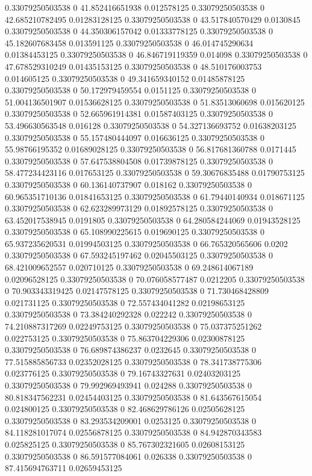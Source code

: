 0.33079250503538 0 41.852416651938 0.012578125
0.33079250503538 0 42.685210782495 0.01283128125
0.33079250503538 0 43.517840570429 0.0130845
0.33079250503538 0 44.350306157042 0.01333778125
0.33079250503538 0 45.182607683458 0.013591125
0.33079250503538 0 46.014745290634 0.01384453125
0.33079250503538 0 46.846719119359 0.014098
0.33079250503538 0 47.678529310249 0.01435153125
0.33079250503538 0 48.510176003753 0.014605125
0.33079250503538 0 49.341659340152 0.01485878125
0.33079250503538 0 50.172979459554 0.0151125
0.33079250503538 0 51.004136501907 0.01536628125
0.33079250503538 0 51.83513060698 0.015620125
0.33079250503538 0 52.665961914381 0.01587403125
0.33079250503538 0 53.496630563548 0.016128
0.33079250503538 0 54.327136693752 0.01638203125
0.33079250503538 0 55.157480444097 0.016636125
0.33079250503538 0 55.98766195352 0.01689028125
0.33079250503538 0 56.817681360788 0.0171445
0.33079250503538 0 57.647538804508 0.01739878125
0.33079250503538 0 58.477234423116 0.017653125
0.33079250503538 0 59.30676835488 0.01790753125
0.33079250503538 0 60.136140737907 0.018162
0.33079250503538 0 60.965351710136 0.01841653125
0.33079250503538 0 61.79440140934 0.018671125
0.33079250503538 0 62.623289973129 0.01892578125
0.33079250503538 0 63.452017538945 0.0191805
0.33079250503538 0 64.280584244069 0.01943528125
0.33079250503538 0 65.108990225615 0.019690125
0.33079250503538 0 65.937235620531 0.01994503125
0.33079250503538 0 66.765320565606 0.0202
0.33079250503538 0 67.593245197462 0.02045503125
0.33079250503538 0 68.421009652557 0.020710125
0.33079250503538 0 69.248614067189 0.02096528125
0.33079250503538 0 70.076058577487 0.0212205
0.33079250503538 0 70.903343319425 0.02147578125
0.33079250503538 0 71.730468428809 0.021731125
0.33079250503538 0 72.557434041282 0.02198653125
0.33079250503538 0 73.384240292328 0.022242
0.33079250503538 0 74.210887317269 0.02249753125
0.33079250503538 0 75.037375251262 0.022753125
0.33079250503538 0 75.863704229306 0.02300878125
0.33079250503538 0 76.689874386237 0.0232645
0.33079250503538 0 77.515885856733 0.02352028125
0.33079250503538 0 78.341738775306 0.023776125
0.33079250503538 0 79.16743327631 0.02403203125
0.33079250503538 0 79.992969493941 0.024288
0.33079250503538 0 80.818347562231 0.02454403125
0.33079250503538 0 81.643567615054 0.024800125
0.33079250503538 0 82.468629786126 0.02505628125
0.33079250503538 0 83.293534209001 0.0253125
0.33079250503538 0 84.118281017074 0.02556878125
0.33079250503538 0 84.942870343583 0.025825125
0.33079250503538 0 85.767302321605 0.02608153125
0.33079250503538 0 86.591577084061 0.026338
0.33079250503538 0 87.415694763711 0.02659453125
